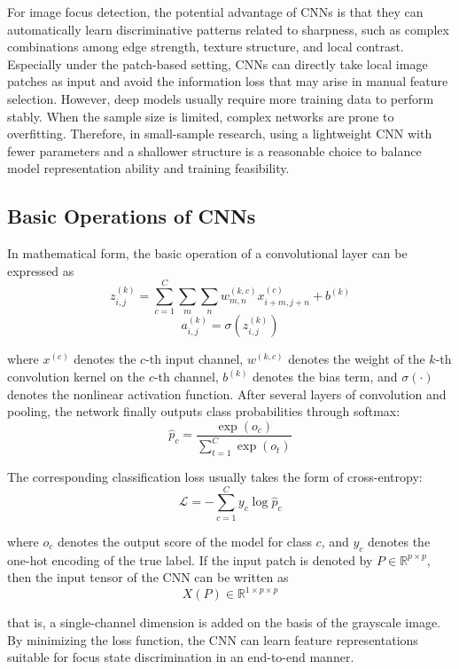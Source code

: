 \par For image focus detection, the potential advantage of CNNs is that they can
automatically learn discriminative patterns related to sharpness, such as
complex combinations among edge strength, texture structure, and local
contrast. Especially under the patch-based setting, CNNs can directly take
local image patches as input and avoid the information loss that may arise in
manual feature selection. However, deep models usually require more training
data to perform stably. When the sample size is limited, complex networks are
prone to overfitting. Therefore, in small-sample research, using a lightweight
CNN with fewer parameters and a shallower structure is a reasonable choice to
balance model representation ability and training feasibility.

\subsection{Basic Operations of CNNs}
\par In mathematical form, the basic operation of a convolutional layer can be
expressed as
\begin{equation}
    z_{i,j}^{(k)}=
    \sum_{c=1}^{C}\sum_{m}\sum_{n}
    w_{m,n}^{(k,c)}x_{i+m,j+n}^{(c)}+b^{(k)}
    \label{eq:cnn-conv-basic}
\end{equation}
\begin{equation}
    a_{i,j}^{(k)}=\sigma\!\left(z_{i,j}^{(k)}\right)
    \label{eq:cnn-activation-basic}
\end{equation}
\par where $x^{(c)}$ denotes the $c$-th input channel, $w^{(k,c)}$ denotes the
weight of the $k$-th convolution kernel on the $c$-th channel, $b^{(k)}$
denotes the bias term, and $\sigma(\cdot)$ denotes the nonlinear activation
function. After several layers of convolution and pooling, the network finally
outputs class probabilities through softmax:
\begin{equation}
    \hat{p}_c=
    \frac{\exp(o_c)}{\sum_{t=1}^{C}\exp(o_t)}
    \label{eq:softmax-basic}
\end{equation}
\par The corresponding classification loss usually takes the form of
cross-entropy:
\begin{equation}
    \mathcal{L}=
    -\sum_{c=1}^{C} y_c\log \hat{p}_c
    \label{eq:cross-entropy-basic}
\end{equation}
\par where $o_c$ denotes the output score of the model for class $c$, and $y_c$
denotes the one-hot encoding of the true label. If the input patch is denoted
by $P\in\mathbb{R}^{p\times p}$, then the input tensor of the CNN can be
written as
\begin{equation}
    X(P)\in\mathbb{R}^{1\times p\times p}
    \label{eq:cnn-input-basic}
\end{equation}
\par that is, a single-channel dimension is added on the basis of the grayscale
image. By minimizing the loss function, the CNN can learn feature
representations suitable for focus state discrimination in an end-to-end
manner.

